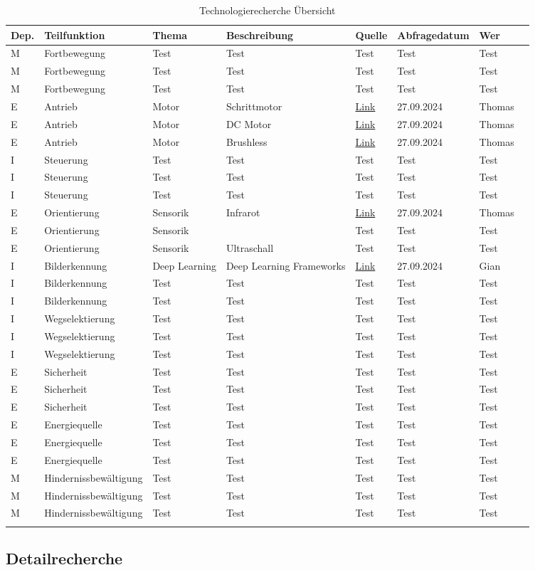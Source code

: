 \scriptsize
\begin{longtable}{l@{\extracolsep{\fill}}p{2cm}p{2cm}p{4cm}p{3cm}lll}
\textbf{Dep.} & \textbf{Teilfunktion} & \textbf{Thema} &
\textbf{Beschreibung} & \textbf{Quelle} & \textbf{Abfragedatum} &
\textbf{Wer}\tabularnewline
\endhead

M & Fortbewegung & Test & Test & Test & Test & Test
\tabularnewline
M & Fortbewegung & Test & Test & Test & Test & Test
\tabularnewline
M & Fortbewegung & Test & Test & Test & Test & Test
\tabularnewline

E & Antrieb & Motor & Schrittmotor & \href{https://wiki.bu.ost.ch/infoportal/_media/hardware/sysp/bauteile/schrittmotor_kurz_erklaert_d.pdf}{Link} & 27.09.2024 & Thomas
\tabularnewline
E & Antrieb & Motor & DC Motor & \href{https://www.elektronikpraxis.de/dc-motoren-empirisch-und-theoretisch-berechnen-a-04bb230e718c01ace9dd584576d618a3/}{Link} & 27.09.2024 & Thomas
\tabularnewline
E & Antrieb & Motor & Brushless & \href{https://www.renesas.com/en/support/engineer-school/brushless-dc-motor-01-overview}{Link} & 27.09.2024 & Thomas
\tabularnewline

I & Steuerung & Test & Test & Test & Test & Test
\tabularnewline
I & Steuerung & Test & Test & Test & Test & Test
\tabularnewline
I & Steuerung & Test & Test & Test & Test & Test
\tabularnewline

E & Orientierung & Sensorik & Infrarot & \href{https://www.elektronik-kompendium.de/sites/raspberry-pi/2802011.htm}{Link} & 27.09.2024 & Thomas
\tabularnewline
E & Orientierung & Sensorik &  & Test & Test & Test 
\tabularnewline
E & Orientierung & Sensorik & Ultraschall & Test & Test & Test 
\tabularnewline

I &  Bilderkennung &  Deep Learning & Deep Learning Frameworks &  \href{https://www.simplilearn.com/tutorials/deep-learning-tutorial/deep-learning-frameworks} {Link}&  27.09.2024 & Gian
\tabularnewline
I & Bilderkennung & Test & Test & Test & Test & Test
\tabularnewline
I & Bilderkennung & Test & Test & Test & Test & Test
\tabularnewline

I & Wegselektierung & Test & Test & Test & Test & Test
\tabularnewline
I & Wegselektierung & Test & Test & Test & Test & Test
\tabularnewline
I & Wegselektierung & Test & Test & Test & Test & Test
\tabularnewline

E & Sicherheit & Test & Test & Test & Test & Test
\tabularnewline
E & Sicherheit & Test & Test & Test & Test & Test
\tabularnewline
E & Sicherheit & Test & Test & Test & Test & Test
\tabularnewline

E & Energiequelle & Test & Test & Test & Test & Test
\tabularnewline
E & Energiequelle & Test & Test & Test & Test & Test
\tabularnewline
E & Energiequelle & Test & Test & Test & Test & Test
\tabularnewline

M & Hindernissbewältigung & Test & Test & Test & Test & Test
\tabularnewline
M & Hindernissbewältigung & Test & Test & Test & Test & Test
\tabularnewline
M & Hindernissbewältigung & Test & Test & Test & Test & Test
\tabularnewline



\caption{Technologierecherche Übersicht}
\label{tab:technologierecherche}
\end{longtable}
\normalsize

\subsection*{Detailrecherche}

